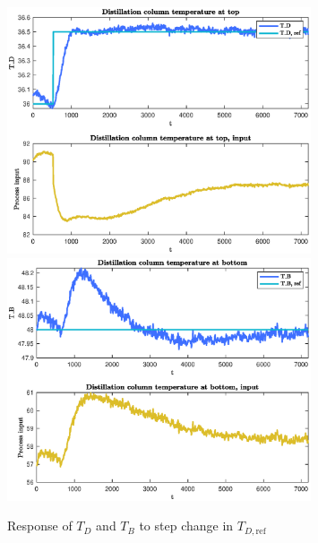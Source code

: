 \documentclass[12pt]{article}
\begin{document}
\begin{figure}
\centering
\includegraphics[width=0.8\textwidth]{../Systemanalyse/Log_Data_to_Matlab/Figurer/LV_tuning/T_D_with_T_D_step.eps}
\includegraphics[width=0.8\textwidth]{../Systemanalyse/Log_Data_to_Matlab/Figurer/LV_tuning/T_B_with_T_D_step.eps}
\caption{Response of $T_D$ and $T_B $ to step change in $T_{D, \textrm{ref}}$}
\label{fig:T_D_step}
\end{figure}
\end{document}
